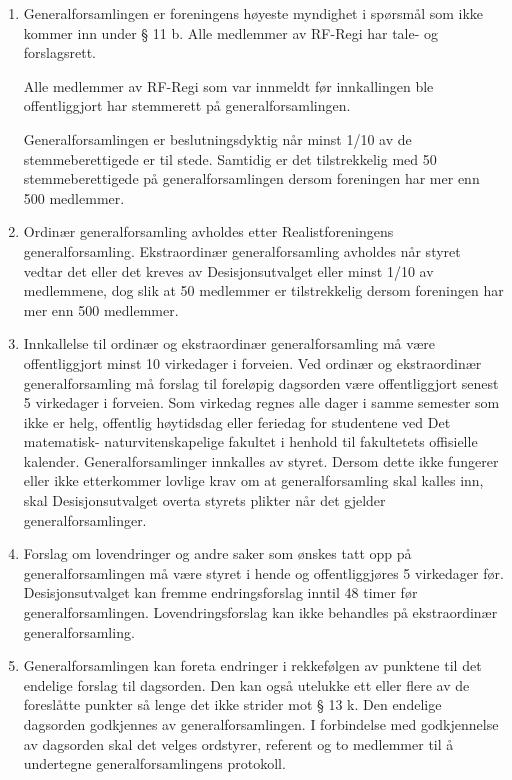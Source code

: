 \documentclass[a4paper,11pt,norsk]{scrartcl}
\begin{document}
\begin{enumerate}
\renewcommand{\labelenumi}{\alph{enumi})}
\item Generalforsamlingen er foreningens høyeste myndighet i spørsmål som
ikke kommer inn under § 11 b.  Alle medlemmer av
RF-Regi har tale- og forslagsrett.

Alle medlemmer av RF-Regi som var innmeldt før innkallingen ble
offentliggjort har stemmerett på generalforsamlingen.

Generalforsamlingen er beslutningsdyktig når minst 1/10 av de
stemmeberettigede er til stede. Samtidig er det tilstrekkelig med 50
stemmeberettigede på generalforsamlingen dersom foreningen har mer
enn 500 medlemmer.

\item Ordinær generalforsamling avholdes etter Realistforeningens
generalforsamling. Ekstraordinær generalforsamling avholdes når styret
vedtar det eller det kreves av Desisjonsutvalget eller minst 1/10
av medlemmene, dog slik at 50 medlemmer er tilstrekkelig dersom
foreningen har mer enn 500 medlemmer.

\item Innkallelse til ordinær og ekstraordinær generalforsamling må være
offentliggjort minst 10 virkedager i forveien. Ved ordinær og
ekstraordinær generalforsamling må forslag til foreløpig dagsorden
være offentliggjort senest 5 virkedager i forveien. Som virkedag
regnes alle dager i samme semester som ikke er helg, offentlig
høytidsdag eller feriedag for studentene ved Det matematisk-
naturvitenskapelige fakultet i henhold til fakultetets offisielle
kalender. Generalforsamlinger innkalles av styret. Dersom
dette ikke fungerer eller ikke etterkommer lovlige krav om at
generalforsamling skal kalles inn, skal Desisjonsutvalget overta
styrets plikter når det gjelder generalforsamlinger.

\item Forslag om lovendringer og andre saker som ønskes tatt opp på
generalforsamlingen må være styret i hende og offentliggjøres
5 virkedager før. Desisjonsutvalget kan fremme endringsforslag
inntil 48 timer før generalforsamlingen. Lovendringsforslag kan
ikke behandles på ekstraordinær generalforsamling.

\item Generalforsamlingen kan foreta endringer i rekkefølgen av punktene
til det endelige forslag til dagsorden. Den kan også utelukke ett
eller flere av de foreslåtte punkter så lenge det ikke strider mot
§ 13 k. Den endelige dagsorden godkjennes av
generalforsamlingen. I forbindelse med godkjennelse av dagsorden
skal det velges ordstyrer, referent og to medlemmer til å
undertegne generalforsamlingens protokoll.


\end{enumerate}
\end{document}
